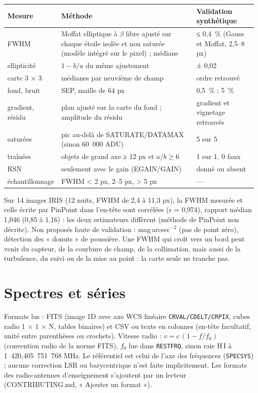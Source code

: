 \begin{center}\small
\begin{tabularx}{\linewidth}{@{}lXl@{}}
\toprule
\textbf{Mesure} & \textbf{Méthode} & \textbf{Validation synthétique}\\
\midrule
FWHM & Moffat elliptique à $\beta$ libre ajusté sur chaque étoile isolée et non saturée (modèle intégré sur le pixel) ; médiane & ≤ 0,4~\% (Gauss et Moffat, 2,5–8 px)\\
ellipticité & $1-b/a$ du même ajustement & ± 0,02\\
carte 3 × 3 & médianes par neuvième de champ & ordre retrouvé\\
fond, bruit & SEP, maille de 64 px & 0,5~\% ; 5~\%\\
gradient, résidu & plan ajusté sur la carte du fond ; amplitude du résidu & gradient et vignetage retrouvés\\
saturées & pic au-delà de SATURATE/DATAMAX (sinon 60~000 ADU) & 5 sur 5\\
traînées & objets de grand axe ≥ 12 px et $a/b \ge 6$ & 1 sur 1, 0 faux\\
RSN & seulement avec le gain (EGAIN/GAIN) & donné ou absent\\
échantillonnage & FWHM < 2 px, 2–5 px, > 5 px & —\\
\bottomrule
\end{tabularx}
\end{center}
Sur 14 images IRIS (12 nuits, FWHM de 2,4 à 11,3 px), la FWHM mesurée et celle écrite par PinPoint dans l'en-tête
sont corrélées (r = 0,974), rapport médian 1,046 (0,85 à 1,16) : les deux estimateurs diffèrent (méthode de PinPoint
non décrite). Non proposés faute de validation : mag\,arcsec$^{-2}$ (pas de point zéro), détection des « donuts » de
poussière. Une FWHM qui croît vers un bord peut venir du capteur, de la courbure de champ, de la collimation, mais
aussi de la turbulence, du suivi ou de la mise au point : la carte seule ne tranche pas.

\section{Spectres et séries}
Formats lus : FITS (image 1D avec axe WCS linéaire \texttt{CRVAL/CDELT/CRPIX}, cubes radio 1 × 1 × N, tables
binaires) et CSV ou texte en colonnes (en-tête facultatif, unité entre parenthèses ou crochets). Vitesse radio :
$v = c\,(1 - f/f_0)$ (convention radio de la norme FITS), $f_0$ lue dans \texttt{RESTFRQ}, sinon raie H\,I à
1~420,405~751~768 MHz. Le référentiel est celui de l'axe des fréquences (\texttt{SPECSYS}) ; aucune correction LSR
ou barycentrique n'est faite implicitement. Les formats des radio-antennes d'enseignement s'ajoutent par un lecteur
(CONTRIBUTING.md, « Ajouter un format »).


